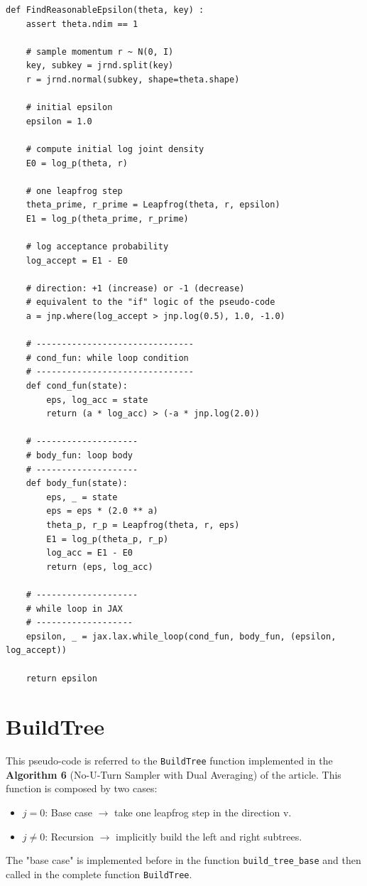 \documentclass[a4paper,12pt]{article}
\begin{document}
\begin{lstlisting}
def FindReasonableEpsilon(theta, key) :
	assert theta.ndim == 1
			
	# sample momentum r ~ N(0, I)
	key, subkey = jrnd.split(key)
	r = jrnd.normal(subkey, shape=theta.shape)
				
	# initial epsilon
	epsilon = 1.0
				
	# compute initial log joint density
	E0 = log_p(theta, r)
				
	# one leapfrog step
	theta_prime, r_prime = Leapfrog(theta, r, epsilon)
	E1 = log_p(theta_prime, r_prime)
				
	# log acceptance probability
	log_accept = E1 - E0
				
	# direction: +1 (increase) or -1 (decrease)
	# equivalent to the "if" logic of the pseudo-code
	a = jnp.where(log_accept > jnp.log(0.5), 1.0, -1.0)
				
	# -------------------------------
	# cond_fun: while loop condition
	# -------------------------------
	def cond_fun(state):
		eps, log_acc = state
		return (a * log_acc) > (-a * jnp.log(2.0))
				
	# --------------------
	# body_fun: loop body
	# --------------------
	def body_fun(state):
		eps, _ = state
		eps = eps * (2.0 ** a)
		theta_p, r_p = Leapfrog(theta, r, eps)
		E1 = log_p(theta_p, r_p)
		log_acc = E1 - E0
		return (eps, log_acc)
  
	# --------------------				
	# while loop in JAX 
	# -------------------
	epsilon, _ = jax.lax.while_loop(cond_fun, body_fun, (epsilon, log_accept))
				
	return epsilon
\end{lstlisting}

\section{BuildTree}
This pseudo-code is referred to the \verb*|BuildTree| function implemented in the \textbf{Algorithm 6} (No-U-Turn Sampler with Dual Averaging) of the article. This function is composed by two cases:
\begin{itemize}
	\item $j=0$: Base case $\rightarrow$ take one leapfrog step in the direction v.
	\item $j \neq 0$: Recursion $\rightarrow$ implicitly build the left and right subtrees.
\end{itemize}
The "base case" is implemented before in the function \verb*|build_tree_base| and then called in the complete function \verb*|BuildTree|. 
\end{document}
